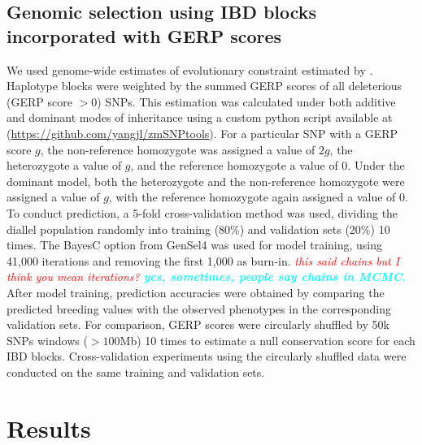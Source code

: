 \documentclass[9pt,twocolumn,twoside]{gsajnl}
\newcommand{\yang}[1]{\textcolor{cyan}{\emph{\bf  #1}} }
\newcommand{\jri}[1]{\textcolor{red}{ \emph{ #1}} }
\begin{document}
\subsection*{Genomic selection using IBD blocks incorporated with GERP scores}

We used genome-wide estimates of evolutionary constraint \citep[GERP][]{Davydov2010} estimated by \citet{rodgers2015recombination}. 
Haplotype blocks were weighted by the summed GERP scores of all deleterious (GERP score $>0$) SNPs. 
This estimation was calculated under both additive and dominant modes of inheritance using a custom python script available at (\url{https://github.com/yangjl/zmSNPtools}). 
For a particular SNP with a GERP score $g$, the non-reference homozygote was assigned a value of $2g$, the heterozygote a value of $g$, and the reference homozygote a value of 0.  
Under the dominant model, both the heterozygote and the non-reference homozygote were assigned a value of $g$, with the reference homozygote again assigned a value of 0.
To conduct prediction, a 5-fold cross-validation method was used, dividing the diallel population  randomly  into training (80\%) and validation sets (20\%)  10 times. 
The BayesC option from GenSel4 \citep{habier2011extension} was used for model training, using 41,000 iterations and removing the first 1,000 as burn-in. \jri{this said chains but I think you mean iterations?} \yang{yes, sometimes, people say chains in MCMC.}
After model training, prediction accuracies were obtained by comparing the predicted breeding values with the observed phenotypes in the corresponding validation sets. 
For comparison, GERP scores were circularly shuffled by 50k SNPs windows ($> 100$Mb) 10 times to estimate a null conservation score for each IBD blocks. 
Cross-validation experiments using the circularly shuffled data were conducted on the same training and validation sets.  





\section*{Results}
\end{document}
